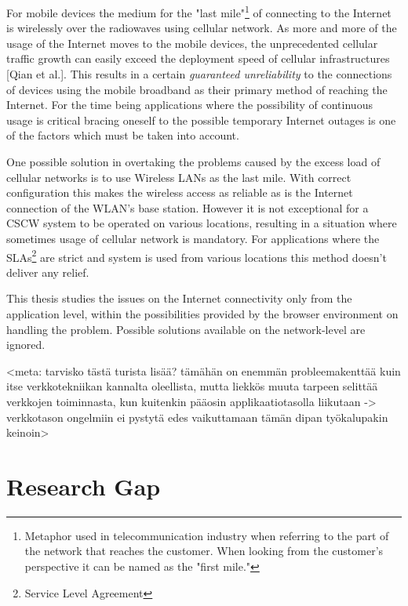 For mobile devices the medium for the "last mile"\footnote{Metaphor used in telecommunication industry when referring to the part of the network that reaches the customer. When looking from the customer's perspective it can be named as the "first mile."} of connecting to the Internet is wirelessly over the radiowaves using cellular network. As more and more of the usage of the Internet moves to the mobile devices, the unprecedented cellular traffic growth can easily exceed the deployment speed of cellular infrastructures [Qian et al.]. This results in a certain \textit{guaranteed unreliability} to the connections of devices using the mobile broadband as their primary method of reaching the Internet. For the time being applications where the possibility of continuous usage is critical bracing oneself to the possible temporary Internet outages is one of the factors which must be taken into account.

One possible solution in overtaking the problems caused by the excess load of cellular networks is to use Wireless LANs as the last mile. With correct configuration this makes the wireless access as reliable as is the Internet connection of the WLAN's base station. However it is not exceptional for a CSCW system to be operated on various locations, resulting in a situation where sometimes usage of cellular network is mandatory. For applications where the SLAs\footnote{Service Level Agreement} are strict and system is used from various locations this method doesn't deliver any relief.

This thesis studies the issues on the Internet connectivity only from the application level, within the possibilities provided by the browser environment on handling the problem. Possible solutions available on the network-level are ignored.

<meta: tarvisko tästä turista lisää? tämähän on enemmän probleemakenttää kuin itse verkkotekniikan kannalta oleellista, mutta liekkös muuta tarpeen selittää verkkojen toiminnasta, kun kuitenkin pääosin applikaatiotasolla liikutaan -> verkkotason ongelmiin ei pystytä edes vaikuttamaan tämän dipan työkalupakin keinoin>




\section{Research Gap}



